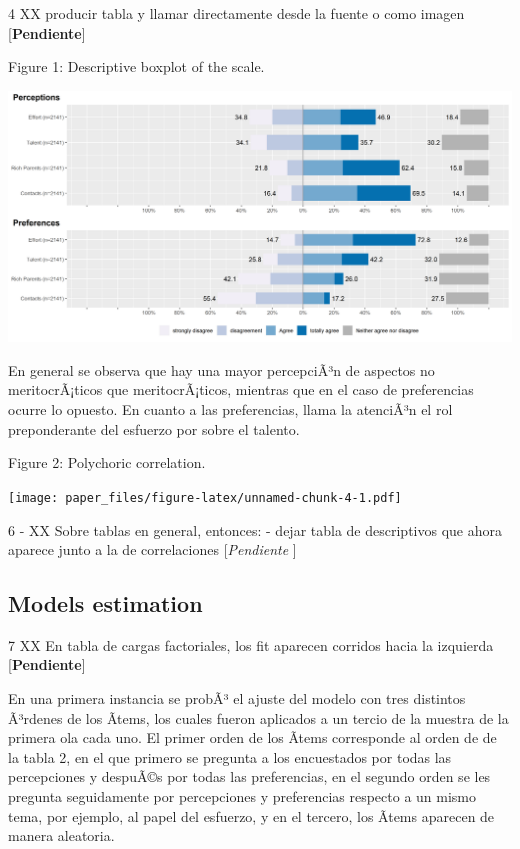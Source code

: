 \documentclass[
]{article}
\begin{document}
4 XX producir tabla y llamar directamente desde la fuente o como imagen
{[}\textbf{Pendiente}{]}

Figure 1: Descriptive boxplot of the scale.

\includegraphics{../output/images/plotlikert.png}

En general se observa que hay una mayor percepciÃ³n de aspectos no
meritocrÃ¡ticos que meritocrÃ¡ticos, mientras que en el caso de
preferencias ocurre lo opuesto. En cuanto a las preferencias, llama la
atenciÃ³n el rol preponderante del esfuerzo por sobre el talento.

Figure 2: Polychoric correlation.

\texttt{[image: paper\_files/figure-latex/unnamed-chunk-4-1.pdf]}

6 - XX Sobre tablas en general, entonces: - dejar tabla de descriptivos
que ahora aparece junto a la de correlaciones {[}\emph{Pendiente} {]}

\hypertarget{models-estimation}{%
\subsection{Models estimation}\label{models-estimation}}

7 XX En tabla de cargas factoriales, los fit aparecen corridos hacia la
izquierda {[}\textbf{Pendiente}{]}

En una primera instancia se probÃ³ el ajuste del modelo con tres
distintos Ã³rdenes de los Ã­tems, los cuales fueron aplicados a un
tercio de la muestra de la primera ola cada uno. El primer orden de los
Ã­tems corresponde al orden de de la tabla 2, en el que primero se
pregunta a los encuestados por todas las percepciones y despuÃ©s por
todas las preferencias, en el segundo orden se les pregunta seguidamente
por percepciones y preferencias respecto a un mismo tema, por ejemplo,
al papel del esfuerzo, y en el tercero, los Ã­tems aparecen de manera
aleatoria.
\end{document}
